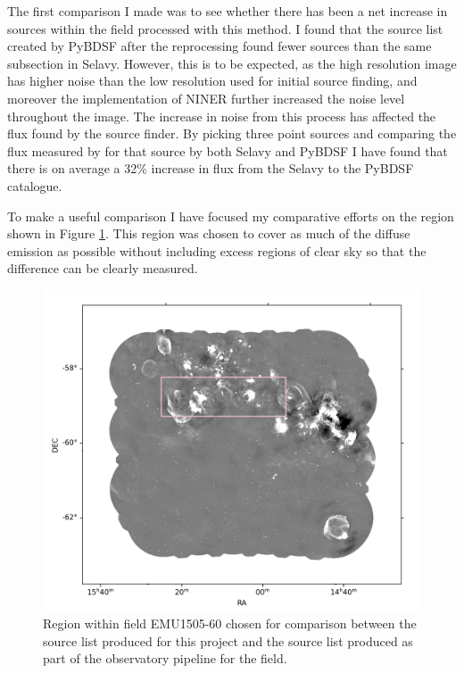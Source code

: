 The first comparison I made was to see whether there has been a net increase in sources within the field processed with this method. I found that the source list created by PyBDSF after the reprocessing found fewer sources than the same subsection in Selavy.  However, this is to be expected, as the high resolution image has higher noise than the low resolution used for initial source finding, and moreover the implementation of NINER further increased the noise level throughout the image. The increase in noise from this process has affected the flux found by the source finder. By picking three point sources and comparing the flux measured by for that source by both Selavy and PyBDSF I have found that there is on average a 32$\%$ increase in flux from the Selavy to the PyBDSF catalogue.

To make a useful comparison I have focused my comparative efforts on the region shown in Figure \ref{fig: comparison_blank}. This region was chosen to cover as much of the diffuse emission as possible without including excess regions of clear sky so that the difference can be clearly measured.

\begin{figure}

\includegraphics[width=0.9\linewidth]{Thesis_Template/Figures/comparison region.png}
\caption[Region chosen for source list comparison]{\small Region within field EMU1505-60 chosen for comparison between the source list produced for this project and the source list produced as part of the observatory pipeline for the field.}
\label{fig: comparison_blank}
\end{figure}

